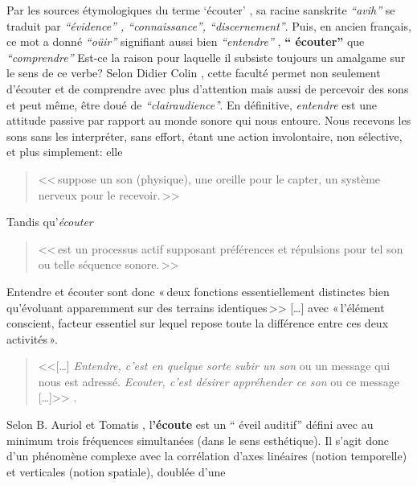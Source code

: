 Par les sources étymologiques du
terme `écouter' ,
 sa racine sanskrite \emph{ ``avih'' } se traduit par
 \emph{``évidence'' , ``connaissance'', ``discernement''}. Puis, en ancien
 français, ce mot a donné \textit{``oüir''} signifiant aussi bien \textit{``entendre''} ,
\textbf{`` écouter'' } que \textit{``comprendre''} \autocite {etymologieWeb}
 Est-ce la raison
pour laquelle il subsiste toujours un amalgame 
sur le sens de ce verbe?
Selon Didier
Colin \autocite {colin2015}, cette faculté
permet non seulement d'écouter et de comprendre avec plus d'attention
mais aussi de percevoir des sons et peut même, être doué de
\textit{``clairaudience'}'. 
En définitive, \emph{entendre} est une attitude passive par rapport au monde sonore
qui nous entoure. Nous recevons les sons sans les interpréter, sans
effort, étant une action involontaire, non
sélective, et plus simplement:  elle
\begin{quote}
	<<\,suppose un son (physique), une oreille
	pour le capter, un système nerveux pour le recevoir.\,>>\autocite[p. 2, ch . 1]{auriol:cle}
 \end{quote}
 Tandis qu'\textit{écouter} 
\begin{quote}
	<<\,est un
	processus actif supposant préférences et répulsions pour tel son ou
	telle séquence sonore.\,>>\autocite[p. 2, ch . 1]{auriol:cle}
        
\end{quote}
Entendre et écouter sont donc  «\,deux
fonctions essentiellement distinctes bien qu'évoluant apparemment sur
des terrains iden\-ti\-ques\,>>
[\dots] avec «\,l'é\-lé\-ment cons\-cient, facteur essentiel sur lequel repose toute la
différence entre ces deux activités\,». \autocite[]{tomatis_oreille_1991}
\begin{quote}
	
	<<[\ldots] \emph{Entendre, c'est en quelque sorte subir
		un son} ou un message qui nous est adressé. \emph{Ecouter, c'est désirer appréhender ce son} ou ce message [\ldots]>>
	\autocite{tomatis:education}.	
\end{quote}
Selon B. Auriol \autocite[18] {auriol:cle} et Tomatis \autocite[52]
{tomatis:loreille}, l\textbf{'écoute} est un `` éveil auditif''  défini avec au
minimum trois
fréquences simultanées (dans le sens esthétique). Il s'agit donc d'un phénomène
complexe avec la corrélation d'axes
linéaires (notion temporelle) et verticales (notion spatiale), doublée d'une
